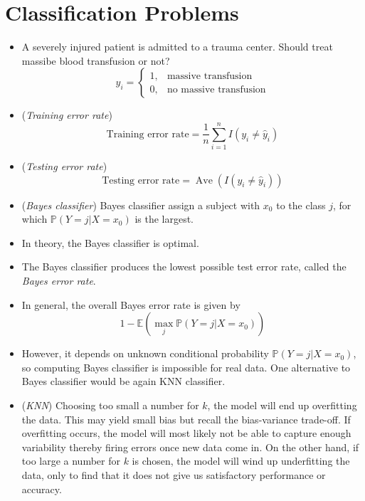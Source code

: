 \documentclass[11pt]{article}
\newcommand{\opn}{\operatorname}
\begin{document}
\section{Classification Problems}
\begin{itemize}
  \item A severely injured patient is admitted to a trauma center. Should treat massibe blood transfusion or not?
  $$
    y_{i} = \begin{cases}1, & \text{massive transfusion}\\ 0, & \text{no massive transfusion}  \end{cases}
  $$
  \item (\emph{Training error rate})
  $$
    \text{Training error rate}= \frac{1}{n}\sum_{i=1}^{n}I\left(y_{i}\neq \hat{y}_{i}\right)
  $$
  \item (\emph{Testing error rate})
  $$
    \text{Testing error rate} = \opn{Ave}\left(I\left(y_{i}\neq \hat{y}_{i}\right)\right)
  $$
  \item (\emph{Bayes classifier}) Bayes classifier assign a subject with $x_{0}$ to the class $j$, for which $\mathbb{P}\left(Y=j|X=x_{0}\right) $ is the largest.
  \item In theory, the Bayes classifier is optimal.
  \item The Bayes classifier produces the lowest possible test error rate, called the \emph{Bayes error rate}.
  \item In general, the overall Bayes error rate is given by
  $$
    1 - \mathbb{E}\left(\max_{j}\mathbb{P}\left(Y=j|X=x_{0}\right) \right)
  $$
  \item However, it depends on unknown conditional probability $\mathbb{P}\left(Y=j|X=x_{0} \right)$, so computing Bayes classifier is impossible for real data. One alternative to Bayes classifier would be again KNN classifier.
  \item (\emph{KNN}) Choosing too small a number for $k$, the model will end up overfitting the data. This may yield small bias but recall the bias-variance trade-off. If overfitting occurs, the model will most likely not be able to capture enough variability thereby firing errors once new data come in. On the other hand, if too large a number for $k$ is chosen, the model will wind up underfitting the data, only to find that it does not give us satisfactory performance or accuracy.
\end{itemize}
\end{document}
